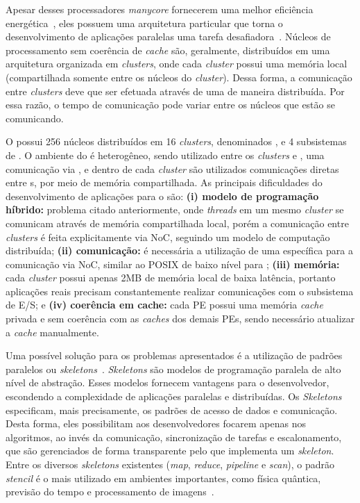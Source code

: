 Apesar desses processadores \textit{manycore} fornecerem uma melhor eficiência
energética~\cite{Castro-IA3-JPDC:2014}, eles possuem uma arquitetura particular
que torna o desenvolvimento de aplicações paralelas uma tarefa
desafiadora~\cite{Varghese14,Castro-PARCO:2016,Castro-SBAC-PAD:2014}. Núcleos de
processamento sem coerência de \textit{cache} são, geralmente, distribuídos em
uma arquitetura organizada em \textit{clusters}, onde cada \textit{cluster}
possui uma memória local (compartilhada somente entre os núcleos do
\textit{cluster}). Dessa forma, a comunicação entre \textit{clusters} deve que
ser efetuada através de uma \noc de maneira distribuída.
Por essa razão, o tempo de comunicação pode variar entre os núcleos que estão se
comunicando.

O \mppa possui 256 núcleos distribuídos em 16 \textit{clusters}, denominados
\pes, e 4 subsistemas de \io. O ambiente do \mppa é heterogêneo, sendo utilizado
entre os \textit{clusters} e \io, uma comunicação via \noc, e
dentro de cada \textit{cluster} são utilizados comunicações diretas entre
\pe{}s, por meio de memória compartilhada. As principais dificuldades do
desenvolvimento de aplicações para o \mppa são: \textbf{(i) modelo de
    programação híbrido:} problema citado anteriormente, onde \textit{threads}
em um mesmo \textit{cluster} se comunicam através de memória compartilhada
local, porém a comunicação entre \textit{clusters} é feita explicitamente via
NoC, seguindo um modelo de computação distribuída; \textbf{(ii) comunicação:} é
necessária a utilização de uma \api
específica para a comunicação via NoC, similar ao POSIX de baixo nível para
\ipc; \textbf{(iii) memória:} cada \textit{cluster} possui apenas 2MB de memória
local de baixa latência, portanto aplicações reais precisam constantemente
realizar comunicações com o subsistema de E/S; e \textbf{(iv) coerência em
    cache:} cada PE possui uma memória \textit{cache} privada e sem coerência
com as \textit{caches} dos demais PEs, sendo necessário atualizar a
\textit{cache} manualmente.

Uma possível solução para os problemas apresentados é a utilização de padrões
paralelos ou \textit{skeletons}~\cite{cole-skeleton:2004}. \textit{Skeletons}
são modelos de programação paralela de alto nível de abstração. Esses modelos fornecem
vantagens para o desenvolvedor, escondendo a complexidade de aplicações
paralelas e distribuídas. Os \textit{Skeletons} especificam, mais precisamente,
os padrões de acesso de dados e comunicação. Desta forma, eles possibilitam aos
desenvolvedores focarem apenas nos algoritmos, ao invés da comunicação,
sincronização de tarefas e escalonamento, que são gerenciados de forma
transparente pelo \fw que implementa um \textit{skeleton}.
Entre os diversos \textit{skeletons} existentes (\textit{map}, \textit{reduce},
\textit{pipeline} e \textit{scan}), o padrão \textit{stencil} é o mais
utilizado em ambientes importantes, como física quântica, previsão do tempo e
processamento de imagens~\cite{gonzalez06,holewinski12}.


